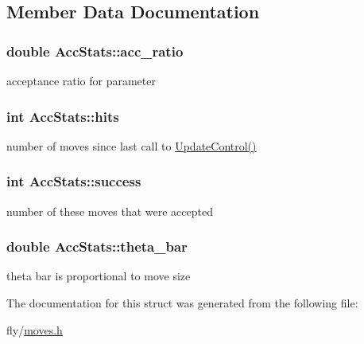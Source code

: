 \subsection{Member Data Documentation}
\hypertarget{structAccStats_a2b39aee6603f5812f840f8da04447c28}{
\subsubsection[{acc\_\-ratio}]{\setlength{\rightskip}{0pt plus 5cm}double {\bf AccStats::acc\_\-ratio}}}
\label{structAccStats_a2b39aee6603f5812f840f8da04447c28}
acceptance ratio for parameter \hypertarget{structAccStats_abe628be4d47984425dbbb60886d2c89a}{
\subsubsection[{hits}]{\setlength{\rightskip}{0pt plus 5cm}int {\bf AccStats::hits}}}
\label{structAccStats_abe628be4d47984425dbbb60886d2c89a}
number of moves since last call to {\ttfamily \hyperlink{moves_8c_aec3936bd73396a7fbbbb0f51d518ae24}{UpdateControl()}} \hypertarget{structAccStats_ad3e93bcadea6e3d1a5060ab63159bc9e}{
\subsubsection[{success}]{\setlength{\rightskip}{0pt plus 5cm}int {\bf AccStats::success}}}
\label{structAccStats_ad3e93bcadea6e3d1a5060ab63159bc9e}
number of these moves that were accepted \hypertarget{structAccStats_ab4014e14e83e9330df034fd58345eb2e}{
\subsubsection[{theta\_\-bar}]{\setlength{\rightskip}{0pt plus 5cm}double {\bf AccStats::theta\_\-bar}}}
\label{structAccStats_ab4014e14e83e9330df034fd58345eb2e}
theta bar is proportional to move size 

The documentation for this struct was generated from the following file:\begin{DoxyCompactItemize}
\item 
fly/\hyperlink{moves_8h}{moves.h}\end{DoxyCompactItemize}
